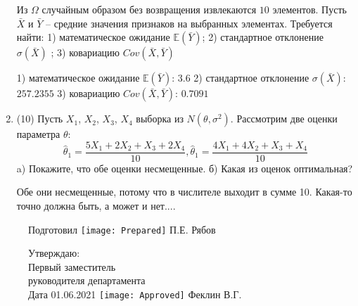 \documentclass[a4paper,14pt]{article}
\begin{document}
\begin{enumerate}
Из $\Omega$ случайным образом без возвращения извлекаются $10$ элементов. 
Пусть $\bar X$ и $\bar Y$ – средние значения признаков на выбранных элементах. 
Требуется найти: 1) математическое ожидание $\mathbb{E}(\bar Y)$; 2) стандартное отклонение $\sigma(\bar X)$ ; 
3) ковариацию $Cov(\bar X, \bar Y)$




1) математическое ожидание $\mathbb{E}(\bar Y)$: $3.6$ 
2) стандартное отклонение $\sigma(\bar X)$: $257.2355$
3) ковариацию $Cov(\bar X, \bar Y)$: $0.7091$


\item


(10) Пусть $X _{1}$, $X _{2}$, $X _{3}$, $X _{4}$ выборка из $N(\theta, \sigma ^{2})$. Рассмотрим две оценки параметра $\theta$:
\[\hat \theta _{1} = \frac{5X _{1} + 2X _{2} + X _{3} + 2X _{4}}{10}, \hat \theta _{1} = \frac{4X _{1} + 4X _{2} + X _{3} + X _{4}}{10}\]
a) Покажите, что обе оценки несмещенные.
б) Какая из оценок оптимальная?




Обе они несмещенные, потому что в числителе выходит в сумме 10.
Какая-то точно должна быть, а может и нет....


\end{enumerate}

\begin{figure}[H]
	Подготовил
	\hfill
	\texttt{[image: Prepared]}
	П.Е. Рябов
\end{figure}


\begin{figure}[H]
	Утверждаю:\\
	Первый заместитель\\
	руководителя департамента\\
	Дата 01.06.2021
	\hfill
	\texttt{[image: Approved]}
	Феклин В.Г.
\end{figure}
\end{document}
